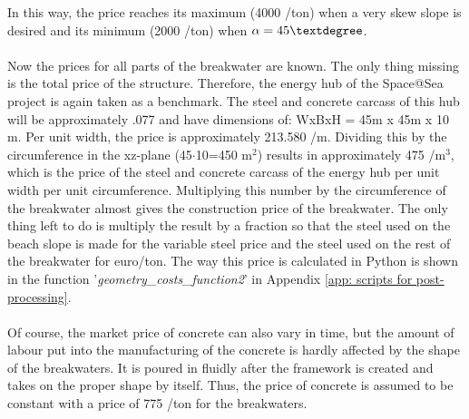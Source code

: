 In this way, the price reaches its maximum (4000 \texteuro/ton) when a very skew slope is desired and its minimum (2000 \texteuro/ton) when $\alpha=45 \textdegree$. \\
\\
Now the prices for all parts of the breakwater are known. The only thing missing is the total price of the structure. Therefore, the energy hub of the Space@Sea project is again taken as a benchmark. The steel and concrete carcass of this hub will be approximately .077 and have dimensions of: WxBxH = 45m x 45m x 10 m. Per unit width, the price is approximately 213.580 \texteuro/m. Dividing this by the circumference in the xz-plane (45$\cdot$10=450 m$^2$) results in approximately 475 \texteuro/m$^3$, which is the price of the steel and concrete carcass of the energy hub per unit width per unit circumference. Multiplying this number by the circumference of the breakwater almost gives the construction price of the breakwater. The only thing left to do is multiply the result by a fraction so that the steel used on the beach slope is made for the variable steel price and the steel used on the rest of the breakwater for  euro/ton. The way this price is calculated in Python is shown in the function '\textit{geometry\_costs\_function2}' in Appendix \ref{app: scripts for post-processing}.\\
\\
Of course, the market price of concrete can also vary in time, but the amount of labour put into the manufacturing of the concrete is hardly affected by the shape of the breakwaters. It is poured in fluidly after the framework is created and takes on the proper shape by itself. Thus, the price of concrete is assumed to be constant with a price of 775 \texteuro/ton for the breakwaters. \\

